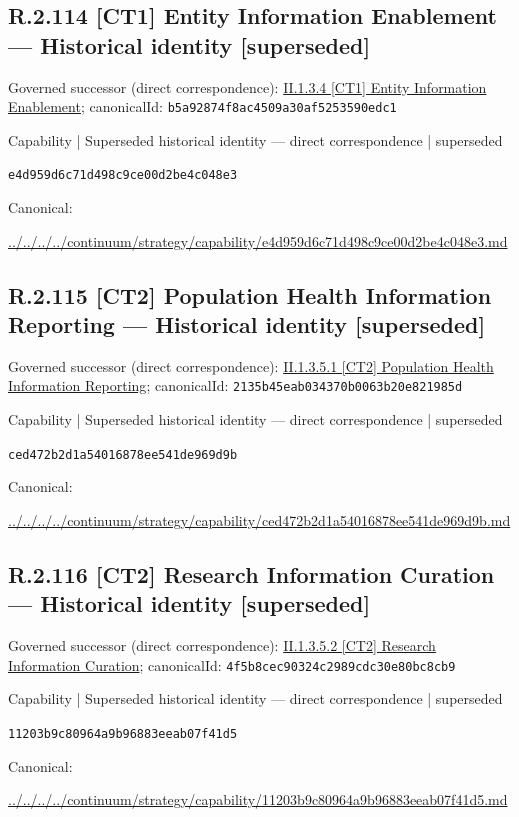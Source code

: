 \documentclass[10pt,a4paper]{article}
\begin{document}
\subsection*{R.2.114 [CT1] Entity Information Enablement — Historical identity [superseded]}
Governed successor (direct correspondence): \hyperref[element-b5a92874f8ac4509a30af5253590edc1]{II.1.3.4 [CT1] Entity Information Enablement}; canonicalId: \texttt{b5a92874f8ac4509a30af5253590edc1}\par
\label{element-e4d959d6c71d498c9ce00d2be4c048e3}
{\small Capability | Superseded historical identity — direct correspondence | superseded}\par
\texttt{e4d959d6c71d498c9ce00d2be4c048e3}\par
Canonical: \par
{\footnotesize\url{../../../../continuum/strategy/capability/e4d959d6c71d498c9ce00d2be4c048e3.md}}\par
\subsection*{R.2.115 [CT2] Population Health Information Reporting — Historical identity [superseded]}
Governed successor (direct correspondence): \hyperref[element-2135b45eab034370b0063b20e821985d]{II.1.3.5.1 [CT2] Population Health Information Reporting}; canonicalId: \texttt{2135b45eab034370b0063b20e821985d}\par
\label{element-ced472b2d1a54016878ee541de969d9b}
{\small Capability | Superseded historical identity — direct correspondence | superseded}\par
\texttt{ced472b2d1a54016878ee541de969d9b}\par
Canonical: \par
{\footnotesize\url{../../../../continuum/strategy/capability/ced472b2d1a54016878ee541de969d9b.md}}\par
\subsection*{R.2.116 [CT2] Research Information Curation — Historical identity [superseded]}
Governed successor (direct correspondence): \hyperref[element-4f5b8cec90324c2989cdc30e80bc8cb9]{II.1.3.5.2 [CT2] Research Information Curation}; canonicalId: \texttt{4f5b8cec90324c2989cdc30e80bc8cb9}\par
\label{element-11203b9c80964a9b96883eeab07f41d5}
{\small Capability | Superseded historical identity — direct correspondence | superseded}\par
\texttt{11203b9c80964a9b96883eeab07f41d5}\par
Canonical: \par
{\footnotesize\url{../../../../continuum/strategy/capability/11203b9c80964a9b96883eeab07f41d5.md}}\par
\end{document}
